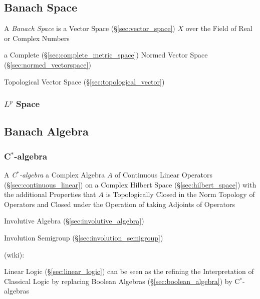 \subsection{Banach Space}\label{sec:banach_space}

A \emph{Banach Space} is a Vector Space (\S\ref{sec:vector_space}) $X$ over the
Field of Real or Complex Numbers

a Complete (\S\ref{sec:complete_metric_space}) Normed Vector Space
(\S\ref{sec:normed_vectorspace})

Topological Vector Space (\S\ref{sec:topological_vector})



\subsubsection{$L^p$ Space}\label{sec:lp_space}



\subsection{Banach Algebra}\label{sec:banach_algebra}

\subsubsection{C$^*$-algebra}\label{sec:cstar_algebra}

A \emph{C$^*$-algebra} a Complex Algebra $A$ of Continuous Linear
Operators (\S\ref{sec:continuous_linear}) on a Complex Hilbert Space
(\S\ref{sec:hilbert_space}) with the additional Properties that $A$ is
Topologically Closed in the Norm Topology of Operators and Closed
under the Operation of taking Adjoints of Operators

Involutive Algebra (\S\ref{sec:involutive_algebra})

Involution Semigroup (\S\ref{sec:involution_semigroup})

(wiki):

Linear Logic (\S\ref{sec:linear_logic}) can be seen as the refining
the Interpretation of Classical Logic by replacing Boolean Algebras
(\S\ref{sec:boolean_algebra}) by C$^*$-algebras



